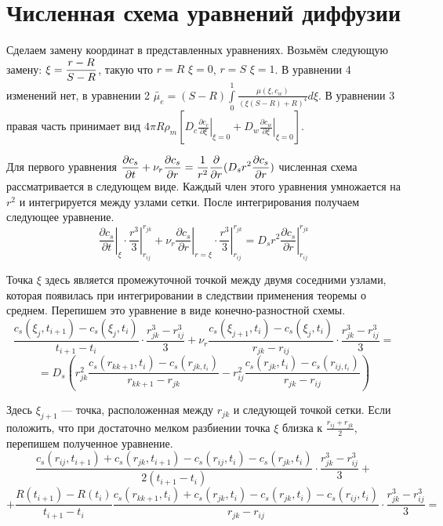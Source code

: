 \section{Численная схема уравнений диффузии}
\par Сделаем замену координат в представленных уравнениях. Возьмём следующую замену: $\displaystyle \xi = \frac{r-R}{S-R}$, такую что $r = R$ $\xi = 0$, $r = S$ $\xi = 1$. В уравнении 4 изменений нет, в уравнении 2 $\tilde{\mu_{e}}=(S-R)\int\limits^{1}_{0}\frac{\mu(\xi, c_{w})}{(\xi(S-R)+R)^{4}}d\xi$. В уравнении 3 правая часть принимает вид $4\pi R\rho_{m}[D_{c}\left.\frac{\partial c_{c}}{\partial \xi}\right|_{\xi=0}+D_{w}\left.\frac{\partial c_{w}}{\partial \xi}\right|_{\xi=0}]$.

\par Для первого уравнения $\displaystyle \frac{\partial c_{s}}{\partial t}+\nu_{r} \frac{\partial c_{s}}{\partial r}=\frac{1}{r^{2}}\frac{\partial}{\partial r}(D_{s}r^{2}\frac{\partial c_{s}}{\partial r})$ численная схема рассматривается в следующем виде. Каждый член этого уравнения умножается на $r^{2}$ и интегрируется между узлами сетки. После интегрирования получаем следующее уравнение.
$$\left.\frac{\partial c_{s}}{\partial t}\right|_{\xi}\cdot\left.\frac{r^{3}}{3}\right|^{r_{jk}}_{r_{ij}}+\nu_{r}\left.\frac{\partial c_{s}}{\partial r}\right|_{r=\xi}\cdot\left.\frac{r^{3}}{3}\right|^{r_{jk}}_{r_{ij}}=\left.D_{s}r^{2}\frac{\partial c_{s}}{\partial r}\right|^{r_{jk}}_{r_{ij}}$$
\par Точка $\xi$ здесь является промежуточной точкой между двумя соседними узлами, которая появилась при интегрировании в следствии применения теоремы о среднем. Перепишем это уравнение в виде конечно-разностной схемы.
$$\frac{c_{s}(\xi_{j},t_{i+1})-c_{s}(\xi_{j},t_{i})}{t_{i+1}-t_{i}}\cdot\frac{r_{jk}^{3}-r_{ij}^{3}}{3}+\nu_{r}\frac{c_{s}(\xi_{j+1},t_{i})-c_{s}(\xi_{j},t_{i})}{r_{jk}-r_{ij}}\cdot\frac{r_{jk}^{3}-r_{ij}^{3}}{3}=$$
$$=D_{s}\left(r_{jk}^{2}\frac{c_{s}(r_{kk+1},t_{i})-c_{s}(r_{jk,t_{i}})}{r_{kk+1}-r_{jk}}-r_{ij}^{2}\frac{c_{s}(r_{jk},t_{i})-c_{s}(r_{ij,t_{i}})}{r_{jk}-r_{ij}}\right)$$
\par Здесь $\xi_{j+1}$ --- точка, расположенная между $r_{jk}$ и следующей точкой сетки. Если положить, что при достаточно мелком разбиении точка $\xi$ близка к $\frac{r_{ij}+r_{jk}}{2}$, перепишем полученное уравнение.
$$\frac{c_{s}(r_{ij}, t_{i+1})+c_{s}(r_{jk}, t_{i+1})-c_{s}(r_{ij}, t_{i})-c_{s}(r_{jk}, t_{i})}{2(t_{i+1}-t_{i})}\cdot\frac{r_{jk}^{3}-r_{ij}^{3}}{3}+$$
$$+\frac{R(t_{i+1})-R(t_{i})}{t_{i+1}-t_{i}}\frac{c_{s}(r_{kk+1}, t_{i})+c_{s}(r_{jk}, t_{i})-c_{s}(r_{jk}, t_{i})-c_{s}(r_{ij}, t_{i})}{r_{jk}-r_{ij}}\cdot\frac{r_{jk}^{3}-r_{ij}^{3}}{3}=$$
